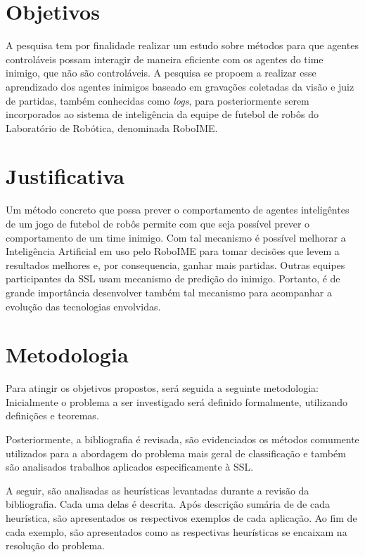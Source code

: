 \section{Objetivos}

A pesquisa tem por finalidade realizar um estudo sobre métodos para que agentes controláveis
possam interagir de maneira eficiente com os agentes do time inimigo, que não são controláveis.
A pesquisa se propoem a realizar esse aprendizado dos agentes inimigos baseado em gravações
coletadas da visão e juiz de partidas, também conhecidas como \textit{logs}, para posteriormente
serem incorporados ao sistema de inteligência da equipe de futebol de robôs do Laboratório
de Robótica, denominada RoboIME.

\section{Justificativa}

Um método concreto que possa prever o comportamento de agentes inteligêntes de um jogo de
futebol de robôs permite com que seja possível prever o comportamento de um time inimigo.
Com tal mecanismo é possível melhorar a Inteligência Artificial em uso pelo RoboIME
para tomar decisões que levem a resultados melhores e, por consequencia, ganhar mais partidas.
Outras equipes participantes da SSL usam mecanismo de predição do inimigo.
Portanto, é de grande importância desenvolver também tal mecanismo para acompanhar a evolução
das tecnologias envolvidas.

\section{Metodologia}

Para atingir os objetivos propostos, será seguida a seguinte metodologia:
Inicialmente o problema a ser investigado será definido formalmente,
utilizando definições e teoremas.

Posteriormente, a bibliografia é revisada, são evidenciados os métodos comumente
utilizados para a abordagem do problema mais geral de classificação e também são
analisados trabalhos aplicados especificamente à SSL.

A seguir, são analisadas as heurísticas levantadas durante a
revisão da bibliografia. Cada uma delas é descrita. Após descrição sumária de
de cada heurística, são apresentados os respectivos exemplos de cada aplicação.
Ao fim de cada exemplo, são apresentados como as respectivas heurísticas se encaixam na
resolução do problema.

